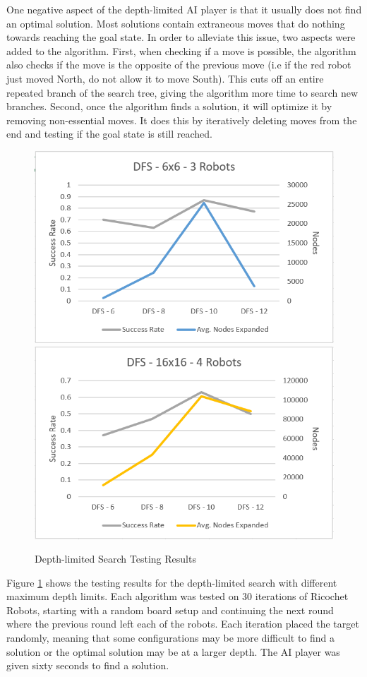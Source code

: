 \documentclass[a4paper,10pt]{article}
\begin{document}
  One negative aspect of the depth-limited AI player is that it usually does not find an optimal solution.  Most solutions contain extraneous moves that do nothing
  towards reaching the goal state.  In order to alleviate this issue, two aspects were added to the algorithm.  First, when checking if a move is possible, the
  algorithm also checks if the move is the opposite of the previous move (i.e if the red robot just moved North, do not allow it to move South).  This cuts off an
  entire repeated branch of the search tree, giving the algorithm more time to search new branches.  Second, once the algorithm finds a solution, it will optimize it
  by removing non-essential moves.  It does this by iteratively deleting moves from the end and testing if the goal state is still reached. \\

  \begin{figure}[h!]
    \centering
   \includegraphics[width=0.45\linewidth]{figures/img1.PNG}
    \includegraphics[width=0.45\linewidth]{figures/img2.PNG}
    \caption{Depth-limited Search Testing Results}
    \label{fig:DFS_chart}
  \end{figure}

  Figure \ref{fig:DFS_chart} shows the testing results for the depth-limited search with different maximum depth limits.  Each algorithm was tested on 30 iterations
  of Ricochet Robots, starting with a random board setup and continuing the next round where the previous round left each of the robots.  Each iteration placed the
  target randomly, meaning that some configurations may be more difficult to find a solution or the optimal solution may be at a larger depth.  The AI player was
  given sixty seconds to find a solution. \\
\end{document}
